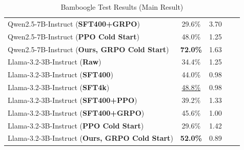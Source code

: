 \begin{table}[!t]
\begin{minipage}[t]{0.452\textwidth}
{\begin{tabular}{lcccc}
Qwen2.5-7B-Instruct (\textbf{SFT400+GRPO}) & 29.6\% & 3.70 \\
Qwen2.5-7B-Instruct (\textbf{PPO Cold Start}) & 48.0\% & 1.25 \\
Qwen2.5-7B-Instruct (\textbf{Ours, GRPO Cold Start}) & \textbf{72.0\%} &  1.63\\
\midrule
Llama-3.2-3B-Instruct (\textbf{Raw}) & 34.4\% & 1.25 \\
Llama-3.2-3B-Instruct (\textbf{SFT400})  & 44.0\% & 0.98 \\
Llama-3.2-3B-Instruct (\textbf{SFT4k}) & \uline{48.8\%} & 0.98 \\
Llama-3.2-3B-Instruct (\textbf{SFT400+PPO}) & 39.2\% & 1.33 \\
Llama-3.2-3B-Instruct (\textbf{SFT400+GRPO}) & 45.6\% & 1.00 \\
Llama-3.2-3B-Instruct (\textbf{PPO Cold Start}) & 29.6\% & 1.42 \\
Llama-3.2-3B-Instruct (\textbf{Ours, GRPO Cold Start}) & \textbf{52.0\%} & 0.89 \\
\bottomrule
\end{tabular}
}
\caption{Bamboogle Test Results (Main Result)}
\label{tab:bamboogle-result-main}

\end{minipage}

\end{table}

